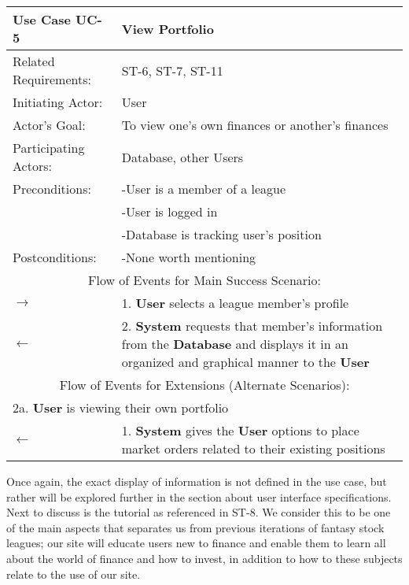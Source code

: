 \begin{centering}
\label{UC-5}
\renewcommand\arraystretch{1.3} %
\begin{longtable}{|p{1.2in} p{5in}|}
\hline

\bfseries{\color{color1}Use Case UC-5} & \bfseries{\color{color1}View Portfolio} \\
\hline
Related Requirements: & ST-6, ST-7, ST-11 \\ 
Initiating Actor:     & User \\
Actor's Goal:         & To view one's own finances or another's finances \\
Participating Actors:  & Database, other Users \\
Preconditions:        & -User is a member of a league \\
 & -User is logged in \\
 & -Database is tracking user's position \\
Postconditions:       & -None worth mentioning \\
\hline
\multicolumn{2}{|c|}{\color{color1}Flow of Events for Main Success Scenario:}\\
\hline
$\rightarrow$ & 1. \textbf{User} selects a league member's profile \\
$\leftarrow$ & 2. \textbf{System} requests that member's information from the \textbf{Database} and displays it in an organized and graphical manner to the \textbf{User} \\
\hline
\multicolumn{2}{|c|}{\color{color1}Flow of Events for Extensions (Alternate Scenarios):} \\
\hline
\multicolumn{2}{|p{6.2in}|}{2a. \textbf{User} is viewing their own portfolio} \\
\hline
$\leftarrow$ & 1. \textbf{System} gives the \textbf{User} options to place market orders related to their existing positions \\
\hline
\end{longtable}
\end{centering}

Once again, the exact display of information is not defined in the use case, but rather will be explored further in the section about user interface specifications. Next to discuss is the tutorial as referenced in ST-8. We consider this to be one of the main aspects that separates us from previous iterations of fantasy stock leagues; our site will educate users new to finance and enable them to learn all about the world of finance and how to invest, in addition to how to these subjects relate to the use of our site.\\


